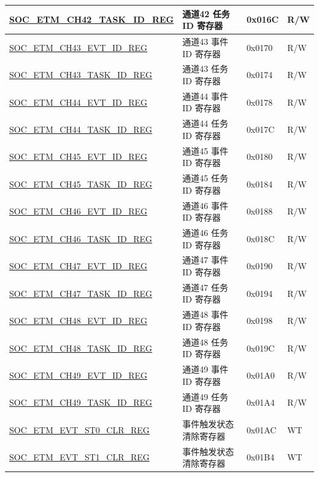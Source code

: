 \begin{longtable}{ | p{6cm} | p{6.2cm} | p{1.3cm} | p{2cm} | }
\hyperref[regdesc:SOCETMCHNTASKIDREG]{SOC\_ETM\_CH42\_TASK\_ID\_REG} & 通道42 任务 ID 寄存器 & 0x016C & R/W \\ \hline
\hyperref[regdesc:SOCETMCHNEVTIDREG]{SOC\_ETM\_CH43\_EVT\_ID\_REG} & 通道43 事件 ID 寄存器 & 0x0170 & R/W \\ \hline
\hyperref[regdesc:SOCETMCHNTASKIDREG]{SOC\_ETM\_CH43\_TASK\_ID\_REG} & 通道43 任务 ID 寄存器 & 0x0174 & R/W \\ \hline
\hyperref[regdesc:SOCETMCHNEVTIDREG]{SOC\_ETM\_CH44\_EVT\_ID\_REG} & 通道44 事件 ID 寄存器 & 0x0178 & R/W \\ \hline
\hyperref[regdesc:SOCETMCHNTASKIDREG]{SOC\_ETM\_CH44\_TASK\_ID\_REG} & 通道44 任务 ID 寄存器 & 0x017C & R/W \\ \hline
\hyperref[regdesc:SOCETMCHNEVTIDREG]{SOC\_ETM\_CH45\_EVT\_ID\_REG} & 通道45 事件 ID 寄存器 & 0x0180 & R/W \\ \hline
\hyperref[regdesc:SOCETMCHNTASKIDREG]{SOC\_ETM\_CH45\_TASK\_ID\_REG} & 通道45 任务 ID 寄存器 & 0x0184 & R/W \\ \hline
\hyperref[regdesc:SOCETMCHNEVTIDREG]{SOC\_ETM\_CH46\_EVT\_ID\_REG} & 通道46 事件 ID 寄存器 & 0x0188 & R/W \\ \hline
\hyperref[regdesc:SOCETMCHNTASKIDREG]{SOC\_ETM\_CH46\_TASK\_ID\_REG} & 通道46 任务 ID 寄存器 & 0x018C & R/W \\ \hline
\hyperref[regdesc:SOCETMCHNEVTIDREG]{SOC\_ETM\_CH47\_EVT\_ID\_REG} & 通道47 事件 ID 寄存器 & 0x0190 & R/W \\ \hline
\hyperref[regdesc:SOCETMCHNTASKIDREG]{SOC\_ETM\_CH47\_TASK\_ID\_REG} & 通道47 任务 ID 寄存器 & 0x0194 & R/W \\ \hline
\hyperref[regdesc:SOCETMCHNEVTIDREG]{SOC\_ETM\_CH48\_EVT\_ID\_REG} & 通道48 事件 ID 寄存器 & 0x0198 & R/W \\ \hline
\hyperref[regdesc:SOCETMCHNTASKIDREG]{SOC\_ETM\_CH48\_TASK\_ID\_REG} & 通道48 任务 ID 寄存器 & 0x019C & R/W \\ \hline
\hyperref[regdesc:SOCETMCHNEVTIDREG]{SOC\_ETM\_CH49\_EVT\_ID\_REG} & 通道49 事件 ID 寄存器 & 0x01A0 & R/W \\ \hline
\hyperref[regdesc:SOCETMCHNTASKIDREG]{SOC\_ETM\_CH49\_TASK\_ID\_REG} & 通道49 任务 ID 寄存器 & 0x01A4 & R/W \\ \hline
\hyperref[regdesc:SOCETMEVTST0CLRREG]{SOC\_ETM\_EVT\_ST0\_CLR\_REG} & 事件触发状态清除寄存器 & 0x01AC & WT \\ \hline
\hyperref[regdesc:SOCETMEVTST1CLRREG]{SOC\_ETM\_EVT\_ST1\_CLR\_REG} & 事件触发状态清除寄存器 & 0x01B4 & WT \\ \hline

\end{longtable}
